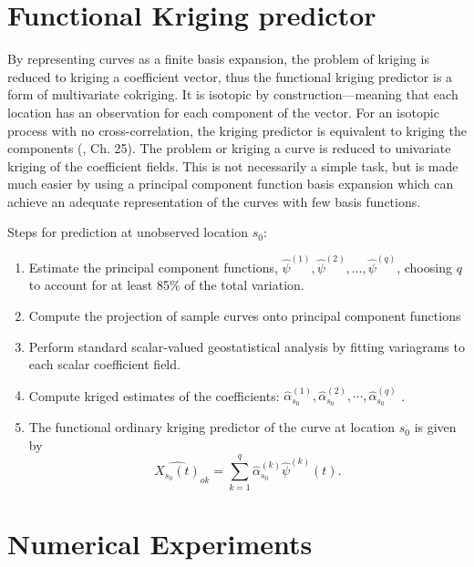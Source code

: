 \section{Functional Kriging predictor} 

\label{sec:functional_kriging_predictor}

By representing curves as a finite basis expansion, the problem of kriging is reduced to kriging a coefficient vector, thus the functional kriging predictor is a form of multivariate cokriging. It is isotopic by construction---meaning that each location has an observation for each component of the vector. For an isotopic process with no cross-correlation, the kriging predictor is equivalent to kriging the components (\cite{wackernagel2003multivariate}, Ch. 25). The problem or kriging a curve is reduced to univariate kriging of the coefficient fields. This is not necessarily a simple task, but is made much easier by using a principal component function basis expansion which can achieve an adequate representation of the curves with few basis functions.

Steps for prediction at unobserved location $s_0$: 
\begin{enumerate}
	\item Estimate the principal component functions, $\hat{\psi}^{(1)}, \hat{\psi}^{(2)}, \dots, \hat{\psi}^{(q)}$, choosing $q$ to account for at least 85\% of the total variation. 
	\item Compute the projection of sample curves onto principal component functions 
	\item Perform standard scalar-valued geostatistical analysis by fitting variagrams to each scalar coefficient field.
	\item Compute kriged estimates of the coefficients: $\hat{\alpha}_{s_0}^{(1)}, \hat{\alpha}_{s_0}^{(2)}, \cdots, \hat{\alpha}_{s_0}^{(q)}$ .
	\item The functional ordinary kriging predictor of the curve at location $s_0$ is given by
	\begin{equation}
		\widehat{X_{s_0}(t)}_{ok} = \sum_{k=1}^{q} \hat{\alpha}_{s_0}^{(k)}\hat{\psi}^{(k)}(t).
	\end{equation} 
	
\end{enumerate}



\section{Numerical Experiments} 

